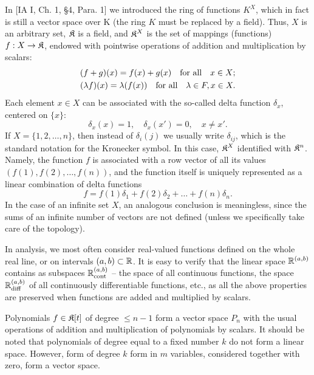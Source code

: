 \begin{example}\label{ex:function-space}
	In [IA I, Ch. 1, \S4, Para. 1] we introduced the ring of functions $K^X$, which in fact is still a vector space over K (the ring $K$ must be replaced by a field). Thus, $X$ is an arbitrary set, ${\mathfrak{K}}$ is a field, and ${{\mathfrak{K}}}^X$ is the set of mappings (functions) $f: X\to {\mathfrak{K}}$, endowed with pointwise operations of addition and multiplication by scalars:
\begin{align*}
(f+g)(x) = f(x)+g(x) \text{\quad for all\quad} x\in X;\\
(\lambda f)(x) = \lambda (f(x)) \text{\quad for all\quad} \lambda\in F, x\in X.
\end{align*}
Each element $x\in X$ can be associated with the so-called delta function $\delta_x$, centered on $\{x\}$:
\[\delta_x(x) = 1, \quad \delta_x(x') = 0, \quad x\ne x'.\]
If $X = \{1, 2,\dots, n\}$, then instead of $\delta_i (j)$ we usually write $\delta_{ij}$, which is the standard notation for the Kronecker symbol. In this case, ${{\mathfrak{K}}}^X$ identified with ${{\mathfrak{K}}}^n$. Namely, the function $f$ is associated with a row vector of all its values $(f(1),f(2),\dots ,f(n))$, and the function itself is uniquely represented as a linear combination of delta functions
\[f = f(1)\delta_1 + f(2)\delta_2 + \dots + f(n)\delta_n.\]
In the case of an infinite set $X$, an analogous conclusion is meaningless, since the sums of an infinite number of vectors are not defined (unless we specifically take care of the topology).

In analysis, we most often consider real-valued functions defined on the whole real line, or on intervals $(a, b)\subset {\mathbb{R}}$. It is easy to verify that the linear space ${\mathbb{R}}^{(a,b)}$ contains as subspaces ${\mathbb{R}}_{\mathrm{cont}}^{(a,b)}$ -- the space of all continuous functions, the space ${\mathbb{R}}_{\mathrm{diff}}^{(a,b)}$ of all continuously differentiable functions, etc., as all the above properties are preserved when functions are added and multiplied by scalars.
\end{example}

\begin{example}
	Polynomials $f\in {\mathfrak{K}} [t]$ of degree $\le n-1$ form a vector space $P_n$ with the usual operations of addition and multiplication of polynomials by scalars. It should be noted that polynomials of degree equal to a fixed number $k$ do not form a linear space. However, form of degree $k$ form in $m$ variables, considered together with zero, form a vector space. 
\end{example}

